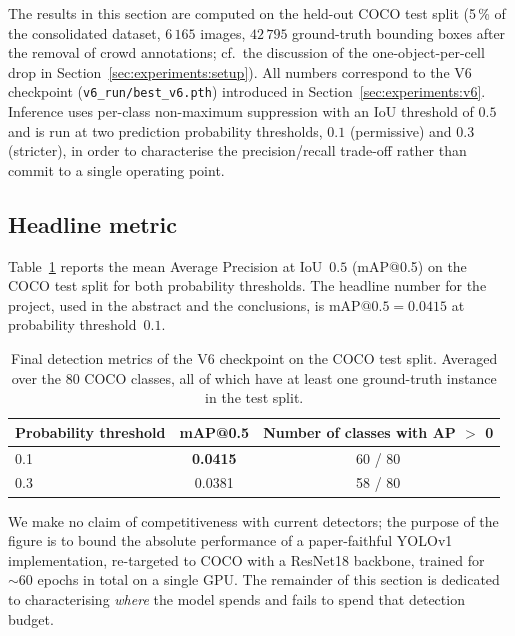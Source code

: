 
The results in this section are computed on the held-out COCO test split (5\,\%
of the consolidated dataset, $6\,165$ images, $42\,795$ ground-truth bounding
boxes after the removal of crowd annotations; cf.\ the discussion of the
one-object-per-cell drop in Section~\ref{sec:experiments:setup}). All
numbers correspond to the V6 checkpoint (\texttt{v6\_run/best\_v6.pth})
introduced in Section~\ref{sec:experiments:v6}. Inference uses per-class non-maximum
suppression with an IoU threshold of $0.5$ and is run at two prediction
probability thresholds, $0.1$ (permissive) and $0.3$ (stricter), in order to
characterise the precision/recall trade-off rather than commit to a single
operating point.

\subsection{Headline metric}
\label{sec:results:headline}

Table~\ref{tab:headline} reports the mean Average Precision at IoU~$0.5$
(mAP@0.5) on the COCO test split for both probability thresholds. The
headline number for the project, used in the abstract and the conclusions, is
$\mathrm{mAP}@0.5 = 0.0415$ at probability threshold~$0.1$.

\begin{table}[!ht]
\centering
\caption{Final detection metrics of the V6 checkpoint on the COCO test split.
Averaged over the 80 COCO classes, all of which have at least one ground-truth
instance in the test split.}
\label{tab:headline}
\small
\begin{tabular}{lcc}
\toprule
\textbf{Probability threshold} & \textbf{mAP@0.5} & \textbf{Number of classes with AP $>$ 0} \\
\midrule
0.1 & \textbf{0.0415} & 60 / 80 \\
0.3 & 0.0381          & 58 / 80 \\
\bottomrule
\end{tabular}
\end{table}

\noindent We make no claim of competitiveness with current detectors; the
purpose of the figure is to bound the absolute performance of a paper-faithful
YOLOv1 implementation, re-targeted to COCO with a ResNet18 backbone, trained
for $\sim 60$ epochs in total on a single GPU. The remainder of this section
is dedicated to characterising \emph{where} the model spends and fails to
spend that detection budget.

